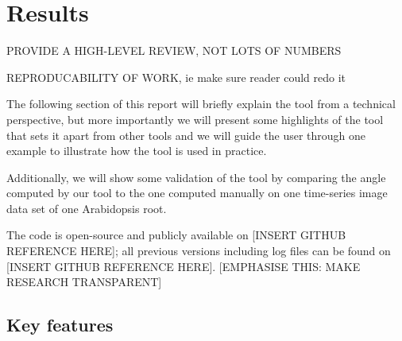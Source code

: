 
\chapter{Results} %

\label{results} %

%


PROVIDE A HIGH-LEVEL REVIEW, NOT LOTS OF NUMBERS

REPRODUCABILITY OF WORK, ie make sure reader could redo it


The following section of this report will briefly explain the tool from a technical perspective, but more importantly  %
we will present some highlights of the tool that sets it apart from other tools and we will guide the user through one example to illustrate how the tool is used in practice.

Additionally, we will show some validation of the tool by comparing the angle computed by our tool to the one computed manually on one time-series image data set of one Arabidopsis root. 

The code is open-source and publicly available on [INSERT GITHUB REFERENCE HERE]; all previous versions including log files can be found on [INSERT GITHUB REFERENCE HERE].
[EMPHASISE THIS: MAKE RESEARCH TRANSPARENT]


\section{Key features} %

